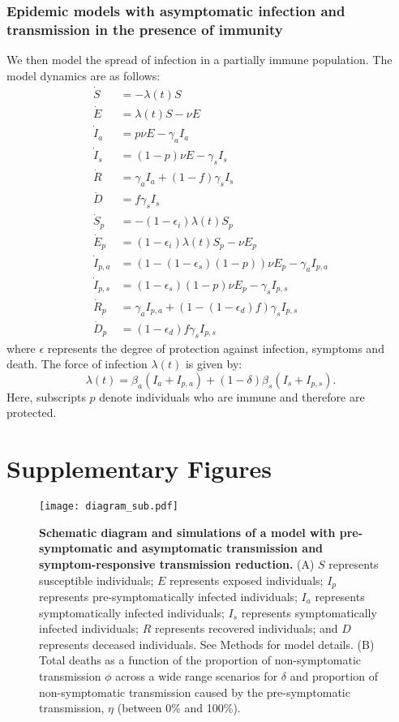 \documentclass[12pt]{article}
\begin{document}
\subsubsection*{Epidemic models with asymptomatic infection and transmission in the presence of immunity}

We then model the spread of infection in a partially immune population.
The model dynamics are as follows:
\begin{align}
\dot{S} &= -\lambda (t) S \\
\dot{E} &= \lambda (t) S - \nu E\\
\dot{I}_a &= p \nu E - \gamma_a I_a\\
\dot{I}_s &= (1-p) \nu E -\gamma_s I_s\\
\dot{R} &= \gamma_a I_a + (1-f) \gamma_s I_s \\
\dot{D} &= f \gamma_s I_s\\
\dot{S}_p &= - (1-\epsilon_i) \lambda (t) S_p \\
\dot{E}_p &= (1-\epsilon_i) \lambda (t) S_p - \nu E_p\\
\dot{I}_{p, a} &= (1 - (1-\epsilon_s) (1-p)) \nu E_p - \gamma_a I_{p,a}\\
\dot{I}_{p, s} &= (1-\epsilon_s) (1-p) \nu E_p -\gamma_s I_{p,s}\\
\dot{R}_p &= \gamma_a I_{p,a} + (1-(1-\epsilon_d) f) \gamma_s I_{p,s} \\
\dot{D}_p &= (1-\epsilon_d) f \gamma_s I_{p,s}
\end{align}
where $\epsilon$ represents the degree of protection against infection, symptoms and death. 
The force of infection $\lambda(t)$ is given by:
\begin{equation}
\lambda(t) = \beta_a (I_a + I_{p,a}) + (1-\delta) \beta_s (I_s + I_{p,s}).
\end{equation}
Here, subscripts $p$ denote individuals who are immune and therefore are protected.

\pagebreak

\section*{Supplementary Figures}

\begin{figure}[!ht]
\begin{center}
\texttt{[image: diagram\_sub.pdf]}
\caption{
\textbf{Schematic diagram and simulations of a model with pre-symptomatic and asymptomatic transmission and symptom-responsive transmission reduction.}
(A) $S$ represents susceptible individuals; $E$ represents exposed individuals; $I_p$ represents pre-symptomatically infected individuals; $I_a$ represents symptomatically infected individuals; $I_s$ represents symptomatically infected individuals; $R$ represents recovered individuals; and $D$ represents deceased individuals. See Methods for model details.
(B) Total deaths as a function of the proportion of non-symptomatic transmission $\phi$ across a wide range scenarios for $\delta$ and proportion of non-symptomatic transmission caused by the pre-symptomatic transmission, $\eta$ (between 0\% and 100\%). 
}
\end{center}
\end{figure}

\pagebreak


\end{document}
